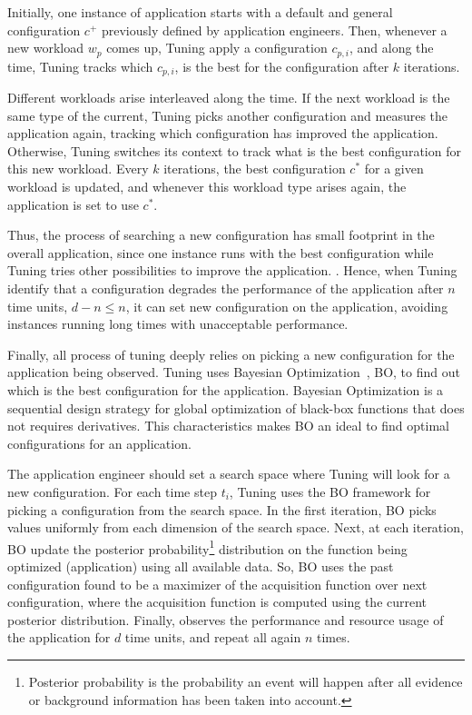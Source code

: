 Initially, one instance of application starts with a default and general
configuration $c^+$ previously defined by application engineers. Then, whenever
a new workload $w_p$ comes up, Tuning apply a configuration $c_{p,i}$, and along
the time, Tuning tracks which $c_{p,i}$, is the best for the configuration after
$k$ iterations.

Different workloads arise interleaved along the time. If the next workload is
the same type of the current, Tuning picks another configuration and measures
the application again, tracking which configuration has improved the
application. Otherwise, Tuning switches its context to track what is the best
configuration for this new workload. Every $k$ iterations, the best
configuration $c^*$ for a given workload is updated, and whenever this workload
type arises again, the application is set to use $c^*$.

Thus, the process of searching a new configuration has small footprint in the
overall application, since one instance runs with the best configuration while
Tuning tries other possibilities to improve the application. . Hence,
when Tuning identify that a configuration degrades the performance of the
application after $n$ time units, $d - n \le n$, it can set new configuration on
the application, avoiding instances running long times with unacceptable
performance.

Finally, all process of tuning deeply relies on picking a new configuration for
the application being observed. Tuning uses Bayesian Optimization~\cite{?}, BO,
to find out which is the best configuration for the application. Bayesian
Optimization is a sequential design strategy for global optimization of
black-box functions that does not requires derivatives. This characteristics
makes BO an ideal to find optimal configurations for an application.



The application engineer should set a search space where Tuning will look for a
new configuration. For each time step $t_i$, Tuning uses the BO framework for
picking a configuration from the search space. In the first iteration, BO picks
values uniformly from each dimension of the search space. Next, at each
iteration, BO update the posterior probability\footnote{Posterior probability is
the probability an event will happen after all evidence or background
information has been taken into account.} distribution on the function being
optimized (application) using all available data. So, BO uses the past
configuration found to be a maximizer of the acquisition function over next
configuration, where the acquisition function is computed using the current
posterior distribution. Finally, observes the performance and resource usage of
the application for $d$ time units, and repeat all again $n$ times.

